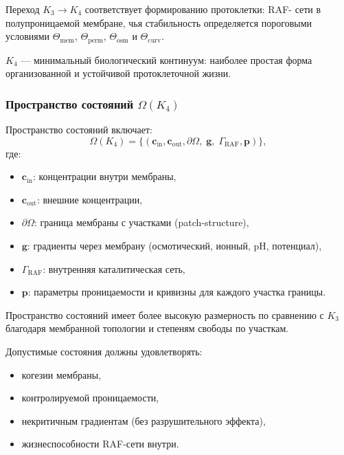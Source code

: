 Переход $K_3 \to K_4$ соответствует формированию протоклетки: RAF-
сети в полупроницаемой мембране, чья стабильность определяется
пороговыми условиями $\Theta_{\mathrm{mem}}$,
$\Theta_{\mathrm{perm}}$, $\Theta_{\mathrm{osm}}$ и
$\Theta_{\mathrm{curv}}$.

$K_4$ — минимальный биологический континуум: наиболее простая форма
организованной и устойчивой протоклеточной жизни.

\subsubsection{Пространство состояний \texorpdfstring{$\Omega(K_4)$}{\Omega(K_4)}}

Пространство состояний включает:
\[
\Omega(K_4) =
\{(\mathbf{c}_{\mathrm{in}},\mathbf{c}_{\mathrm{out}},
  \partial\Omega,\; \mathbf{g},\; \Gamma_{\mathrm{RAF}},
  \mathbf{p})\},
\]
где:
\begin{itemize}
    \item $\mathbf{c}_{\mathrm{in}}$: концентрации внутри мембраны,
    \item $\mathbf{c}_{\mathrm{out}}$: внешние концентрации,
    \item $\partial\Omega$: граница мембраны с участками (patch-structure),
    \item $\mathbf{g}$: градиенты через мембрану (осмотический, ионный,
          pH, потенциал),
    \item $\Gamma_{\mathrm{RAF}}$: внутренняя каталитическая сеть,
    \item $\mathbf{p}$: параметры проницаемости и кривизны для каждого
          участка границы.
\end{itemize}

Пространство состояний имеет более высокую размерность по сравнению с $K_3$
благодаря мембранной топологии и степеням свободы по участкам.

Допустимые состояния должны удовлетворять:
\begin{itemize}
    \item когезии мембраны,
    \item контролируемой проницаемости,
    \item некритичным градиентам (без разрушительного эффекта),
    \item жизнеспособности RAF-сети внутри.
\end{itemize}

